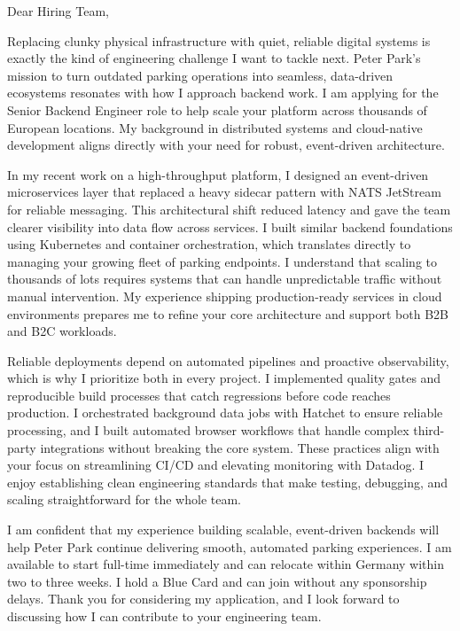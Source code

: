 \documentclass[11pt,a4paper]{coverletter}
\begin{document}

\opening{Dear Hiring Team,}

Replacing clunky physical infrastructure with quiet, reliable digital systems is exactly the kind of engineering challenge I want to tackle next. Peter Park’s mission to turn outdated parking operations into seamless, data-driven ecosystems resonates with how I approach backend work. I am applying for the Senior Backend Engineer role to help scale your platform across thousands of European locations. My background in distributed systems and cloud-native development aligns directly with your need for robust, event-driven architecture.

In my recent work on a high-throughput platform, I designed an event-driven microservices layer that replaced a heavy sidecar pattern with NATS JetStream for reliable messaging. This architectural shift reduced latency and gave the team clearer visibility into data flow across services. I built similar backend foundations using Kubernetes and container orchestration, which translates directly to managing your growing fleet of parking endpoints. I understand that scaling to thousands of lots requires systems that can handle unpredictable traffic without manual intervention. My experience shipping production-ready services in cloud environments prepares me to refine your core architecture and support both B2B and B2C workloads.

Reliable deployments depend on automated pipelines and proactive observability, which is why I prioritize both in every project. I implemented quality gates and reproducible build processes that catch regressions before code reaches production. I orchestrated background data jobs with Hatchet to ensure reliable processing, and I built automated browser workflows that handle complex third-party integrations without breaking the core system. These practices align with your focus on streamlining CI/CD and elevating monitoring with Datadog. I enjoy establishing clean engineering standards that make testing, debugging, and scaling straightforward for the whole team.

I am confident that my experience building scalable, event-driven backends will help Peter Park continue delivering smooth, automated parking experiences. I am available to start full-time immediately and can relocate within Germany within two to three weeks. I hold a Blue Card and can join without any sponsorship delays. Thank you for considering my application, and I look forward to discussing how I can contribute to your engineering team.
\end{document}
